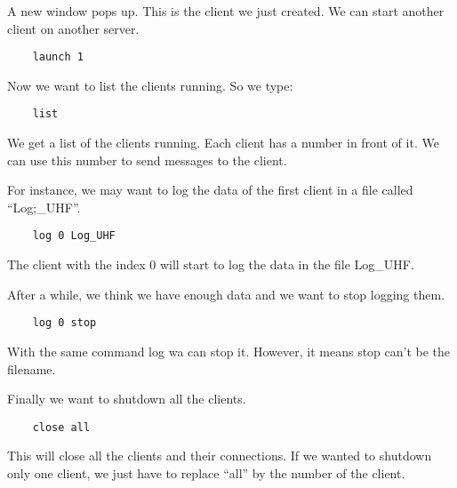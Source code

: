 A new window pops up. This is the client we just created.
We can start another client on another server.
\begin{lstlisting}
	launch 1
\end{lstlisting}


Now we want to list the clients running. So we type:
\begin{lstlisting}
	list
\end{lstlisting}
We get a list of the clients running. Each client has a number in front of it. We can use this number to send messages to the client.


For instance, we may want to log the data of the first client in a file called "`Log;\_UHF"'.
\begin{lstlisting}
	log 0 Log_UHF
\end{lstlisting}
The client with the index 0 will start to log the data in the file Log\_UHF.

After a while, we think we have enough data and we want to stop logging them.
\begin{lstlisting}
	log 0 stop
\end{lstlisting}

With the same command log wa can stop it. However, it means stop can't be the filename.

Finally we want to shutdown all the clients.
\begin{lstlisting}
	close all
\end{lstlisting}
This will close all the clients and their connections. If we wanted to shutdown only one client, we just have to replace "`all"' by the number of the client.






